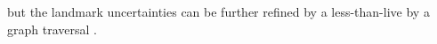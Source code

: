 \documentclass{article}
\begin{document}
\begin{appendices}
    but the landmark uncertainties can be further refined by a less-than-live by a graph traversal \cite{SLAMgraph}.




\end{appendices}

  
\end{document}
